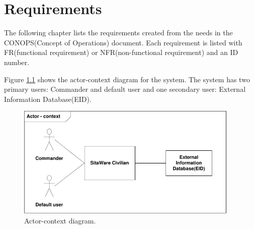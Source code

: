 \chapter{Requirements}
The following chapter lists the requirements created from the needs in the CONOPS(Concept of Operations) document. Each requirement is listed with FR(functional requirement) or NFR(non-functional requirement) and an ID number.

Figure \ref{fig:actor_context} shows the actor-context diagram for the system. The system has two primary users: Commander and default user and one secondary user: External Information Database(EID). 
\begin{figure}[H]
\centering
\includegraphics[width=0.95\textwidth]
{billeder/actor_context.pdf}
\caption{Actor-context diagram.}
\label{fig:actor_context}
\end{figure}















